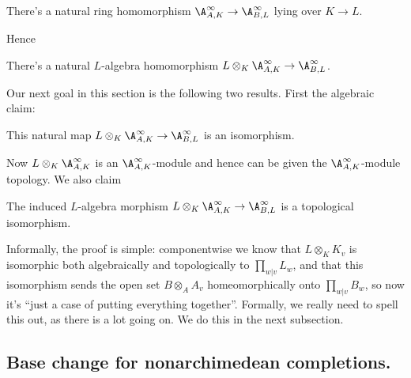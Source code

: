 \begin{definition}
  \label{IsDedekindDomain.FiniteAdeleRing.mapSemialgHom}
  \leanok
  There's a natural ring homomorphism
  $\A_{A,K}^\infty\to\A_{B,L}^\infty$ lying over $K\to L$.
\end{definition}

Hence

\begin{definition}
  \label{TODOneedsLean} %
  There's a natural $L$-algebra homomorphism
  $L\otimes_K\A_{A,K}^\infty\to\A_{B,L}^\infty$.
\end{definition}

Our next goal in this section is the following two results. First the algebraic claim:

\begin{theorem}
  \label{IsDedekindDomain.FiniteAdeleRing.baseChangeAlgEquiv}
  \leanok
  This natural map $L\otimes_K\A_{A,K}^\infty\to\A_{B,L}^\infty$ is an isomorphism.
\end{theorem}

Now $L\otimes_K\A_{A,K}^\infty$ is an $\A_{A,K}^\infty$-module and hence can be given
the $\A_{A,K}^\infty$-module topology. We also claim

\begin{theorem}
  \label{TODOneedslabel}
  \leanok
The induced $L$-algebra morphism
  $L\otimes_K\A_{A,K}^\infty\to\A_{B,L}^\infty$ is a topological isomorphism.
\end{theorem}

Informally, the proof is simple: componentwise we know
that $L\otimes_KK_v$ is isomorphic both algebraically and
topologically to $\prod_{w|v}L_w$, and that this isomorphism
sends the open set $B\otimes_AA_v$ homeomorphically onto
$\prod_{w|v}B_w$, so now it's ``just a case of putting everything
together''. Formally, we really need to spell this out, as there is a lot
going on. We do this in the
next subsection.

\subsection{Base change for nonarchimedean completions.}


